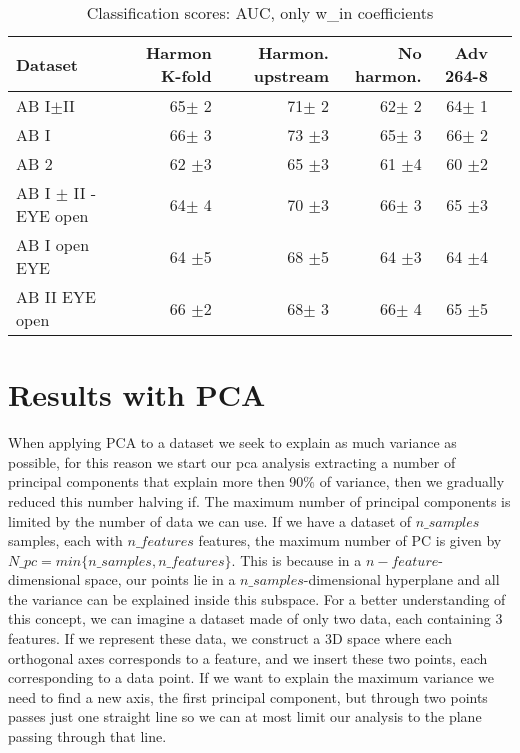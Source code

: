 \documentclass[11pt]{report}
\begin{document}
\begin{table}[!htp]\centering
\scriptsize
\begin{tabular}{lrrrrr}\toprule
Dataset &Harmon K-fold &Harmon. upstream &No harmon. &Adv 264-8 \\\midrule
AB I$\pm$II &65$\pm$ 2 &71$\pm$ 2 &62$\pm$ 2 &64$\pm$ 1 \\
AB I &66$\pm$ 3 &73 $\pm$3 &65$\pm$ 3 &66$\pm$ 2 \\
AB 2 &62 $\pm$3 &65 $\pm$3 &61 $\pm$4 &60 $\pm$2 \\
AB I $\pm$ II - EYE open &64$\pm$ 4 &70 $\pm$3 &66$\pm$ 3 &65 $\pm$3 \\
AB I open EYE &64 $\pm$5 &68 $\pm$5 &64 $\pm$3 &64 $\pm$4 \\
AB II EYE open &66 $\pm$2 &68$\pm$ 3 &66$\pm$ 4 &65 $\pm$5 \\
\bottomrule
\end{tabular}
\caption{Classification scores: AUC, only w\_in coefficients}\label{tab:classification_win}

\end{table}


\newpage

\section{Results with PCA}

When applying PCA to a dataset we seek to explain as much variance as possible, for this reason we start our pca analysis extracting a number of principal components that explain more then 90$\%$ of variance, then we gradually reduced this number halving if.
The maximum number of principal components is limited by the number of data we can use. If we have a dataset of $n\_samples$ samples, each with $n\_features$ features, the maximum number of PC is given by $N\_pc = min\{n\_samples, n\_features\}$.
This is because in a $n-feature$-dimensional space, our points lie in a $n\_samples$-dimensional hyperplane and all the variance can be explained inside this subspace.
For a better understanding of this concept, we can imagine a dataset made of only two data, each containing 3 features. If we represent these data, we construct a 3D space where each orthogonal axes corresponds to a feature, and we insert these two points, each corresponding to a data point.
If we want to explain the maximum variance we need to find a new axis, the first principal component, but through two points passes just one straight line so we can at most limit our analysis to the plane passing through that line.
\end{document}
